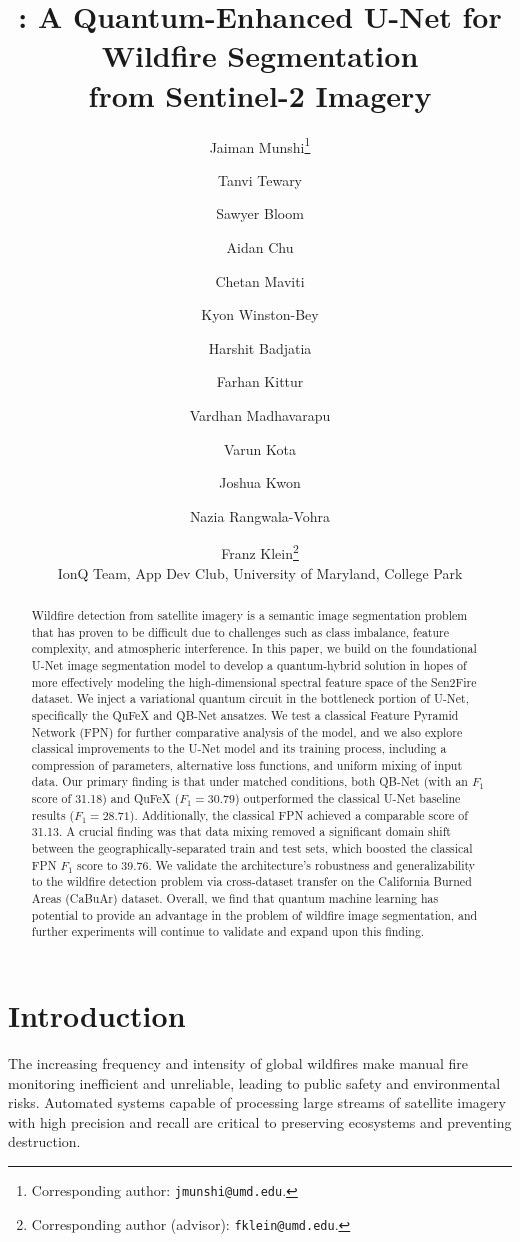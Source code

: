\documentclass{article}
\title{\projectname: A Quantum-Enhanced U-Net for Wildfire Segmentation\\ from Sentinel-2 Imagery}
\author{
Jaiman Munshi\thanks{Corresponding author: \texttt{jmunshi@umd.edu}.} \and Tanvi Tewary \and Sawyer Bloom
\and Aidan Chu \and Chetan Maviti \and Kyon Winston-Bey \and Harshit Badjatia \and Farhan Kittur \and Vardhan Madhavarapu \and Varun Kota \and Joshua Kwon \and Nazia Rangwala-Vohra \and Franz Klein\thanks{Corresponding author (advisor): \texttt{fklein@umd.edu}.}
\\[0.5em]
\normalsize IonQ Team, App Dev Club, University of Maryland, College Park
}
\date{}
\begin{document}
\maketitle

\begin{abstract}
Wildfire detection from satellite imagery is a semantic image segmentation problem that has proven to be difficult due to challenges such as class imbalance, feature complexity, and atmospheric interference. In this paper, we build on the foundational U-Net image segmentation model to develop a quantum-hybrid solution in hopes of more effectively modeling the high-dimensional spectral feature space of the Sen2Fire dataset. We inject a variational quantum circuit in the bottleneck portion of U-Net, specifically the QuFeX and QB-Net ansatzes.  We test a classical Feature Pyramid Network (FPN) for further comparative analysis of the model, and we also explore classical improvements to the U-Net model and its training process, including a compression of parameters, alternative loss functions, and uniform mixing of input data. Our primary finding is that under matched conditions, both QB-Net (with an $F_1$ score of 31.18) and QuFeX ($F_1 = 30.79$) outperformed the classical U-Net baseline results ($F_1 = 28.71$). Additionally, the classical FPN achieved a comparable score of 31.13. A crucial finding was that data mixing removed a significant domain shift between the geographically-separated train and test sets, which boosted the classical FPN $F_1$ score to 39.76. We validate the architecture's robustness and generalizability to the wildfire detection problem via cross-dataset transfer on the California Burned Areas (CaBuAr) dataset. Overall, we find that quantum machine learning has potential to provide an advantage in the problem of wildfire image segmentation, and further experiments will continue to validate and expand upon this finding.
\end{abstract}

\section{Introduction}

The increasing frequency and intensity of global wildfires make manual fire monitoring inefficient and unreliable, leading to public safety and environmental risks. Automated systems capable of processing large streams of satellite imagery with high precision and recall are critical to preserving ecosystems and preventing destruction.
\end{document}
